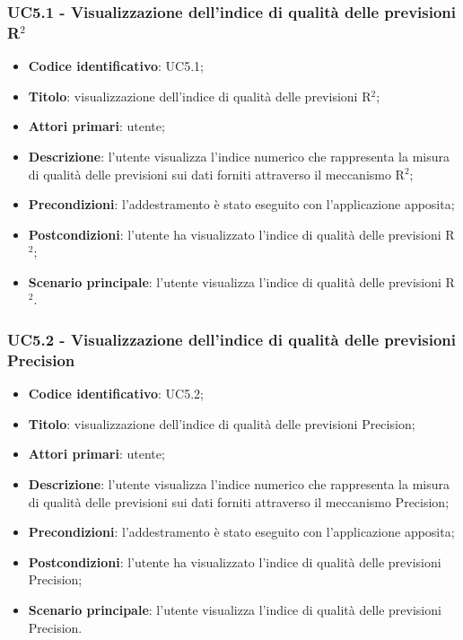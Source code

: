 \subsubsection{UC5.1 - Visualizzazione dell'indice di qualità delle previsioni R$^{2}$}
\begin{itemize}
	\item \textbf{Codice identificativo}: UC5.1;
	\item \textbf{Titolo}: visualizzazione dell'indice di qualità delle previsioni R$^{2}$\glo;
	\item \textbf{Attori primari}: utente;
	\item \textbf{Descrizione}: l'utente visualizza l'indice numerico che rappresenta la misura di qualità delle previsioni sui dati forniti attraverso il meccanismo R$^{2}$\glo;
	\item \textbf{Precondizioni}: l'addestramento è stato eseguito con l'applicazione apposita;
	\item \textbf{Postcondizioni}: l'utente ha visualizzato l'indice di qualità delle previsioni R$^{2}$\glo;
	\item \textbf{Scenario principale}: l'utente visualizza l'indice di qualità delle previsioni R$^{2}$\glo.
\end{itemize} 
\subsubsection{UC5.2 - Visualizzazione dell'indice di qualità delle previsioni Precision}
\begin{itemize}
	\item \textbf{Codice identificativo}: UC5.2;
	\item \textbf{Titolo}: visualizzazione dell'indice di qualità delle previsioni Precision\glo;
	\item \textbf{Attori primari}: utente;
	\item \textbf{Descrizione}: l'utente visualizza l'indice numerico che rappresenta la misura di qualità delle previsioni sui dati forniti attraverso il meccanismo Precision\glo;
	\item \textbf{Precondizioni}: l'addestramento è stato eseguito con l'applicazione apposita;
	\item \textbf{Postcondizioni}: l'utente ha visualizzato l'indice di qualità delle previsioni Precision\glo;
	\item \textbf{Scenario principale}: l'utente visualizza l'indice di qualità delle previsioni Precision\glo.
\end{itemize} 
